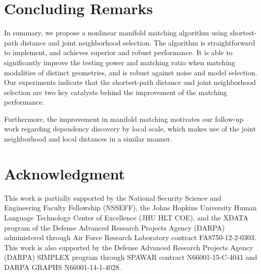 \documentclass[times,twocolumn,final]{elsarticle}
\begin{document}
\section{Concluding Remarks}
\label{conclu}
In summary, we propose a nonlinear manifold matching algorithm using shortest-path distance and joint neighborhood selection. The algorithm is straightforward to implement, and achieves superior and robust performance. It is able to significantly improve the testing power and matching ratio when matching modalities of distinct geometries, and is robust against noise and model selection. Our experiments indicate that the shortest-path distance and joint neighborhood selection are two key catalysts behind the improvement of the matching performance.

Furthermore, the improvement in manifold matching motivates our follow-up work \citep{ShenEtAl2016} regarding dependency discovery by local scale, which makes use of the joint neighborhood and local distances in a similar manner.

\section*{Acknowledgment}
This work is partially supported by the National Security Science and Engineering Faculty Fellowship (NSSEFF),
 the Johns Hopkins University Human Language Technology Center of Excellence (JHU HLT COE), and the
 XDATA program of the Defense Advanced Research Projects Agency (DARPA) administered through Air Force Research Laboratory contract FA8750-12-2-0303. This work is also supported by the Defense Advanced Research Projects Agency (DARPA) SIMPLEX program through SPAWAR contract N66001-15-C-4041 and DARPA GRAPHS N66001-14-1-4028.





\end{document}
